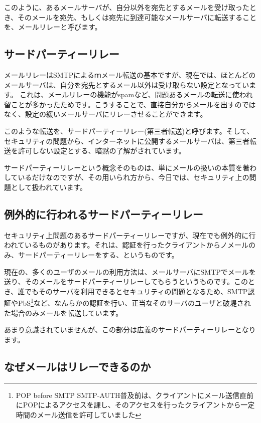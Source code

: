 このように、あるメールサーバが、自分以外を宛先とするメールを受け取ったとき、そのメールを宛先、もしくは宛先に到達可能なメールサーバに転送することを、メールリレーと呼びます。

\subsection{サードパーティーリレー}

メールリレーはSMTPによるｍメール転送の基本ですが、現在では、ほとんどのメールサーバは、自分を宛先とするメール以外は受け取らない設定となっています。
これは、メールリレーの機能がspamなど、問題あるメールの転送に使われ留ことが多かったためです。こうすることで、直接自分からメールを出すのではなく、設定の緩いメールサーバにリレーさせることができます。

このような転送を、サードパーティーリレー(第三者転送)と呼びます。そして、セキュリティの問題から、インターネットに公開するメールサーバは、第三者転送を許可しない設定とする、暗黙の了解がされています。

サードパーティーリレーという概念そのものは、単にメールの扱いの本質を著わしているだけなのですが、その用いられ方から、今日では、セキュリティ上の問題として扱われています。

\subsection{例外的に行われるサードパーティーリレー}

セキュリティ上問題のあるサードパーティーリレーですが、現在でも例外的に行われているものがあります。それは、認証を行ったクライアントからノメールのみ、サードパーティーリレーをする、というものです。

現在の、多くのユーザのメールの利用方法は、メールサーバにSMTPでメールを送り、そのメールをサードパーティーリレーしてもらうというものです。このとき、誰でもそのサーバを利用できるとセキュリティの問題となるため、SMTP認証やPbS\footnote{POP before SMTP SMTP-AUTH普及前は、クライアントにメール送信直前にPOPによるアクセスを課し、そのアクセスを行ったクライアントから一定時間のメール送信を許可していました}など、なんらかの認証を行い、正当なそのサーバのユーザと破堤された場合のみメールを転送しています。

あまり意識されていませんが、この部分は広義のサードパーティーリレーとなります。

\subsection{なぜメールはリレーできるのか}



